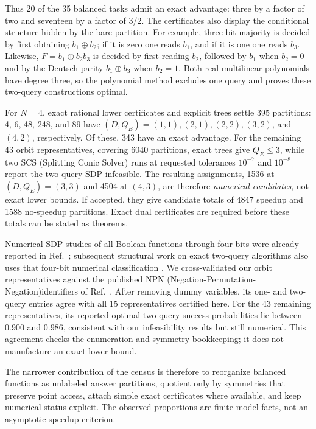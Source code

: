 \documentclass[
  aps,
  prl,
  reprint,
  nofootinbib
]{revtex4-2}
\begin{document}
Thus 20 of the 35 balanced tasks admit an exact advantage: three by a factor
of two and seventeen by a factor of \(3/2\). The certificates also display the
conditional structure hidden by the bare partition. For example, three-bit
majority is decided by first obtaining \(b_1\oplus b_2\); if it is zero one
reads \(b_1\), and if it is one one reads \(b_3\). Likewise,
\(F=b_1\oplus b_2b_3\) is decided by first reading \(b_2\), followed by
\(b_1\) when \(b_2=0\) and by the Deutsch parity \(b_1\oplus b_3\) when
\(b_2=1\). Both real multilinear polynomials have degree three, so the
polynomial method excludes one query and proves these two-query constructions
optimal.

For \(N=4\), exact rational lower certificates and explicit trees settle 395
partitions: 4, 6, 48, 248, and 89 have \((D,Q_E)=(1,1),(2,1),(2,2),(3,2)\),
and \((4,2)\), respectively. Of these, 343 have an exact advantage. For the
remaining 43 orbit representatives, covering 6040 partitions, exact trees give
\(Q_E\le3\), while two SCS  (Splitting Conic Solver) runs at requested tolerances \(10^{-7}\) and
\(10^{-8}\) report the two-query SDP infeasible. The resulting assignments,
1536 at \((D,Q_E)=(3,3)\) and 4504 at
\((4,3)\), are therefore \emph{numerical candidates}, not exact lower bounds.
If accepted, they give candidate totals of 4847 speedup and 1588 no-speedup
partitions. Exact dual certificates are required before these totals can be
stated as theorems.

Numerical SDP studies of all Boolean functions through four bits were already
reported in Ref.~\cite{MontanaroJozsaMitchison2015}; subsequent structural work
on exact two-query algorithms also uses that four-bit numerical classification
\cite{YeYangHuang2024}. We cross-validated our orbit representatives against
the published NPN (Negation-Permutation-Negation)identifiers of Ref.~\cite{MontanaroJozsaMitchison2015}. After
removing dummy variables, its one- and two-query entries agree with all 15
representatives certified here. For the 43 remaining representatives, its
reported optimal two-query success probabilities lie between 0.900 and 0.986,
consistent with our infeasibility results but still numerical. This agreement
checks the enumeration and symmetry bookkeeping; it does not manufacture an
exact lower bound.

The narrower contribution of the census is therefore to reorganize balanced
functions as unlabeled answer partitions, quotient only by symmetries that
preserve point access, attach simple exact certificates where available, and
keep numerical status explicit. The observed proportions are finite-model
facts, not an asymptotic speedup criterion.
\end{document}
